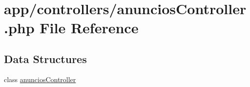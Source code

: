 \hypertarget{anuncios_controller_8php}{}\section{app/controllers/anuncios\+Controller.php File Reference}
\label{anuncios_controller_8php}
\subsection*{Data Structures}
\begin{DoxyCompactItemize}
\item 
class \hyperlink{classanuncios_controller}{anuncios\+Controller}
\end{DoxyCompactItemize}
